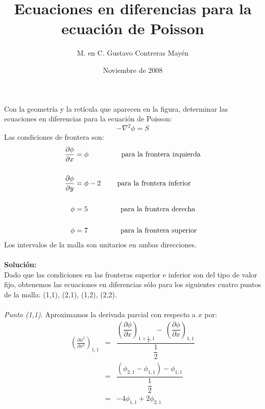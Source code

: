 \documentclass[12pt]{article}
\title{Ecuaciones en diferencias para la ecuación de Poisson}
\author{M. en C. Gustavo Contreras Mayén}
\date{Noviembre de 2008}
\begin{document}
\maketitle
Con la geometría y la retícula que aparecen en la figura, determinar las ecuaciones en diferencias para la ecuación de Poisson:
\begin{equation}\label{eq:Poisson}
- \nabla^{2}\phi=S
\end{equation}
Las condiciones de frontera son:
\begin{align}
\frac {\partial \phi}{\partial x} & = \phi \text{\hspace{1.5cm} para la frontera izquierda} \nonumber \\
\nonumber \\
\frac {\partial \phi}{\partial y} & = \phi - 2 \text{\hspace{0.7cm} para la frontera inferior}\nonumber \\
\nonumber \\
\phi & = 5 \text{\hspace{1.5cm} para la frontera derecha}\nonumber \\
\nonumber \\
\phi & = 7 \text{\hspace{1.5cm} para la frontera superior}\nonumber
\end{align}
Los intervalos de la malla son unitarios en ambas direcciones.\\
\\
\textbf{Solución:}\\
Dado que las condiciones en las fronteras superior e inferior son del tipo de valor fijo, obtenemos las ecuaciones en diferencias sólo para los siguientes cuatro puntos de la malla: (1,1), (2,1), (1,2), (2,2).\\
\\
\textit{Punto (1,1)}. Aproximamos la derivada parcial con respecto a $x$ por:
\begin{eqnarray}\label{eq:par11x}
\left( \frac {\partial \phi^{2}}{\partial x^{2}}\right)_{1,1} & = & \dfrac{\left( \dfrac {\partial \phi}{\partial x}\right)_{1+\frac{1}{2},1} - \ \left( \dfrac {\partial \phi}{\partial x}\right)_{1,1}}{\dfrac{1}{2}}  \nonumber \\
& = & \dfrac {(\phi_{2,1}-\phi_{1,1})-\phi_{1,1}}{\dfrac{1}{2}} \nonumber \\
& = & -4\phi_{1,1}+2\phi_{2,1} %
\end{eqnarray}
\end{document}
